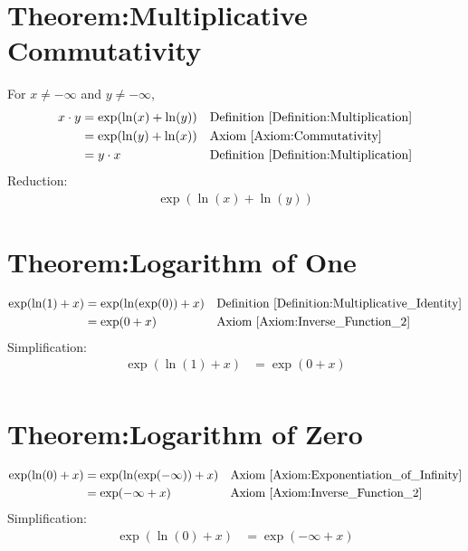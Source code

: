 \documentclass[12pt,a4paper]{report}
\begin{document}
\section{Theorem:Multiplicative Commutativity}
\label{Theorem:Multiplicative_Commutativity}
For $x \neq -\infty$ and $y \neq -\infty$,
\begin{align*}
x \cdot y
&= \exp(\ln(x) + \ln(y))
&& \text{Definition \ref{Definition:Multiplication}} \\
&= \exp(\ln(y) + \ln(x))
&& \text{Axiom \ref{Axiom:Commutativity}} \\
&= y \cdot x
&& \text{Definition \ref{Definition:Multiplication}} \\
\end{align*}
Reduction:
\begin{align*}
\exp(\ln(x) + \ln(y))
\end{align*}

\section{Theorem:Logarithm of One}
\label{Theorem:Logarithm_of_One}
\begin{align*}
\exp(\ln(1) + x)
&= \exp(\ln(\exp(0)) + x)
&& \text{Definition \ref{Definition:Multiplicative_Identity}} \\
&= \exp(0 + x)
&& \text{Axiom \ref{Axiom:Inverse_Function_2}} \\
\end{align*}
Simplification:
\begin{align*}
\exp(\ln(1) + x) &= \exp(0 + x) \\
\end{align*}

\section{Theorem:Logarithm of Zero}
\label{Theorem:Logarithm_of_Zero}
\begin{align*}
\exp(\ln(0) + x)
&= \exp(\ln(\exp(-\infty)) + x)
&& \text{Axiom \ref{Axiom:Exponentiation_of_Infinity}} \\
&= \exp(-\infty + x)
&& \text{Axiom \ref{Axiom:Inverse_Function_2}} \\
\end{align*}
Simplification:
\begin{align*}
\exp(\ln(0) + x) &= \exp(-\infty + x) \\
\end{align*}
\end{document}

